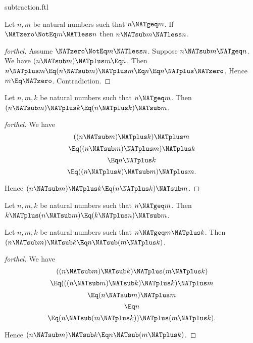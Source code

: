 \documentclass{stex}
\begin{document}
\begin{smodule}{subtraction.ftl}
\begin{proposition}[forthel,id=ARITHMETIC_05_1269537257291776]
  Let $n, m$ be natural numbers such that $n \NATgeq m$.
  If $\NATzero \NotEq m \NATless n$ then $n \NATsub m \NATless n$.
\end{proposition}
\begin{proof}[forthel]
  Assume $\NATzero \NotEq m \NATless n$.
  Suppose $n \NATsub m \NATgeq n$.
  We have $(n \NATsub m) \NATplus m \Eq n$.
  Then $n \NATplus m
    \Eq (n \NATsub m) \NATplus m
    \Eq n
    \Eq n \NATplus \NATzero$.
  Hence $m \Eq \NATzero$.
  Contradiction.
\end{proof}

\begin{proposition}[forthel,id=ARITHMETIC_05_4767595811045376]
  Let $n, m, k$ be natural numbers such that $n \NATgeq m$.
  Then $(n \NATsub m) \NATplus k \Eq (n \NATplus k) \NATsub m$.
\end{proposition}
\begin{proof}[forthel]
  We have
  \[  ((n \NATsub m) \NATplus k) \NATplus m       \]
  \[    \Eq ((n \NATsub m) \NATplus m) \NATplus k   \]
  \[    \Eq n \NATplus k               \]
  \[    \Eq ((n \NATplus k) \NATsub m) \NATplus m.  \]

  Hence $(n \NATsub m) \NATplus k \Eq (n \NATplus k) \NATsub m$.
\end{proof}

\begin{corollary}[forthel,id=ARITHMETIC_05_7578468875239424]
  Let $n, m, k$ be natural numbers such that $n \NATgeq m$.
  Then $k \NATplus (n \NATsub m) \Eq (k \NATplus n) \NATsub m$.
\end{corollary}

\begin{proposition}[forthel,id=ARITHMETIC_05_7595909347016704]
  Let $n, m, k$ be natural numbers such that $n \NATgeq  m \NATplus k$.
  Then $(n \NATsub m) \NATsub k \Eq n \NATsub (m \NATplus k)$.
\end{proposition}
\begin{proof}[forthel]
  We have
  \[  ((n \NATsub m) \NATsub k) \NATplus (m \NATplus k)       \]
  \[    \Eq (((n \NATsub m) \NATsub k) \NATplus k) \NATplus m   \]
  \[    \Eq (n \NATsub m) \NATplus m               \]
  \[    \Eq n                         \]
  \[    \Eq (n \NATsub (m \NATplus k)) \NATplus (m \NATplus k).  \]

  Hence $(n \NATsub m) \NATsub k \Eq n \NATsub (m \NATplus k)$.
\end{proof}
\end{smodule}
\end{document}
